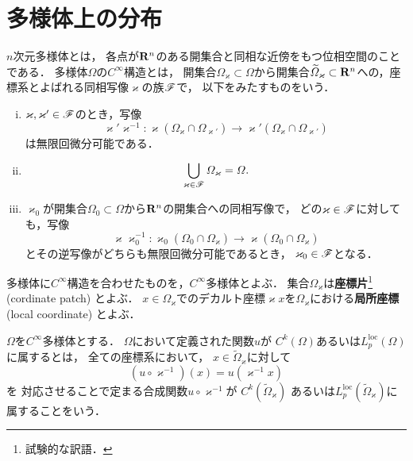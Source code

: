 \section{多様体上の分布}
\begin{DFN}
    \(n\)次元多様体とは，
    各点が\(\mathbf{R}^n\)のある開集合と同相な近傍をもつ位相空間のことである．
    多様体\(\varOmega\)の\(C^\infty\)構造とは，
    開集合\(
        \varOmega_{\varkappa}\subset\varOmega
    \)から開集合\(
        \widetilde{\varOmega}_{\varkappa}\subset\mathbf{R}^n
    \)への，座標系とよばれる同相写像\(\varkappa\)の族\(\mathscr{F}\)で，
    以下をみたすものをいう．
    \begin{enumerate}[i)]
        \item \(\varkappa,\varkappa'\in\mathscr{F}\)のとき，写像\begin{equation}
            \varkappa'\varkappa^{-1}
            \colon
            \varkappa(
                \varOmega_{\varkappa}\cap\varOmega_{\varkappa'}
            )
            \to
            \varkappa'(\varOmega_{\varkappa}\cap\varOmega_{\varkappa'})
        \end{equation}
        は無限回微分可能である．
        \item \[\bigcup_{\varkappa\in\mathscr{F}}\varOmega_{\varkappa}=\varOmega.\]
        \item \(\varkappa_{0}\)が開集合\(
            \varOmega_{0}\subset\varOmega
        \)から\(\mathbf{R}^n\)の開集合への同相写像で，
        どの\(\varkappa\in\mathscr{F}\)に対しても，写像\[
            \varkappa\varkappa_{0}^{-1}
            \colon
            \varkappa_{0}(\varOmega_{0}\cap\varOmega_{\varkappa})
            \to
            \varkappa(\varOmega_{0}\cap\varOmega_{\varkappa})
        \]とその逆写像がどちらも無限回微分可能であるとき，
        \(\varkappa_0\in\mathscr{F}\)となる．
    \end{enumerate}
\end{DFN}
多様体に\(C^\infty\)構造を合わせたものを，\(C^\infty\)多様体とよぶ．
集合\(\varOmega_{\varkappa}\)は\textbf{座標片}\footnote{
    試験的な訳語．
} (cordinate patch) とよぶ．
\(x\in\varOmega_{\varkappa}\)でのデカルト座標\(\varkappa{x}\)を\(
    \varOmega_{\varkappa}
\)における\textbf{局所座標} (local coordinate) とよぶ．

\begin{DFN}
    \(\varOmega\)を\(C^\infty\)多様体とする．
    \(\varOmega\)において定義された関数\(u\)が
    \(C^{k}(\varOmega)\)あるいは\(
        L^{\mathrm{loc}}_{p}(\varOmega)
    \)に属するとは，
    全ての座標系において，
    \(x\in\widetilde{\varOmega}_{\varkappa}\)に対して
    \[(u\circ \varkappa^{-1})(x)=u(\varkappa^{-1}x)\]を
    対応させることで定まる合成関数\(u\circ \varkappa^{-1}\)が
    \(C^{k}(\widetilde{\varOmega}_{\varkappa})\)
    あるいは\(L^{\mathrm{loc}}_{p}(\widetilde{\varOmega}_{\varkappa})\)に
    属することをいう．
\end{DFN}

